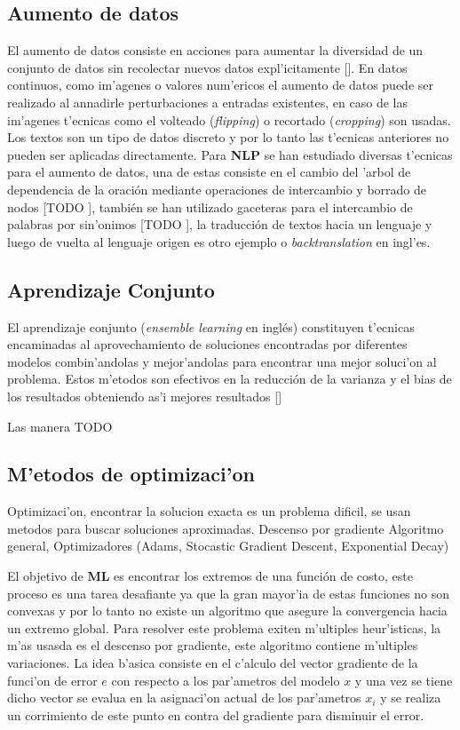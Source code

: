 \subsection{Aumento de datos}

El aumento de datos consiste en acciones para aumentar la diversidad de un conjunto de datos sin recolectar
nuevos datos expl'icitamente [\cite{feng2021data}]. En datos continuos, como im'agenes o valores num'ericos el 
aumento de datos puede ser realizado al annadirle perturbaciones a entradas existentes, en caso de las im'agenes 
t'ecnicas como el volteado (\emph{flipping}) o recortado (\emph{cropping}) son usadas. Los textos son un tipo 
de datos discreto y por lo tanto las t'ecnicas anteriores no pueden ser aplicadas directamente. Para \textbf{NLP}
se han estudiado diversas t'ecnicas para el aumento de datos, una de estas consiste en el cambio del 'arbol de 
dependencia de la oración mediante operaciones de intercambio y borrado de nodos [TODO \cite{}], también se han utilizado 
gaceteras para el intercambio de palabras por sin'onimos [TODO \cite{}], la traducción de textos hacia un lenguaje y luego 
de vuelta al lenguaje origen es otro ejemplo o \emph{backtranslation} en ingl'es. 

\subsection{Aprendizaje Conjunto}

El aprendizaje conjunto (\emph{ensemble learning} en inglés) constituyen t'ecnicas encaminadas al aprovechamiento
de soluciones encontradas por diferentes modelos combin'andolas y mejor'andolas para encontrar una mejor soluci'on 
al problema. Estos m'etodos son efectivos en la reducción de la varianza y el bias de los resultados obteniendo as'i
mejores resultados [\cite{dietterich2002ensemble}] 

Las manera TODO

\subsection{M'etodos de optimizaci'on}

Optimizaci'on, encontrar la solucion exacta es un problema dificil, se usan metodos para buscar soluciones aproximadas.
Descenso por gradiente Algoritmo general, Optimizadores (Adams, Stocastic Gradient Descent, Exponential Decay)

El objetivo de \textbf{ML} es encontrar los extremos de una función de costo, este proceso es una tarea 
desafiante ya que la gran mayor'ia de estas funciones no son convexas y por lo tanto no existe un algoritmo
que asegure la convergencia hacia un extremo global. Para resolver este problema exiten m'ultiples heur'isticas,
la m'as usasda es el descenso por gradiente, este algoritmo contiene m'ultiples variaciones. La idea b'asica consiste 
en el c'alculo del vector gradiente de la funci'on de error $e$ con respecto a los par'ametros del modelo $x$ y una vez se 
tiene dicho vector se evalua en la asignaci'on actual de los par'ametros $x_i$ y se realiza un corrimiento de este punto 
en contra del gradiente para disminuir el error.

